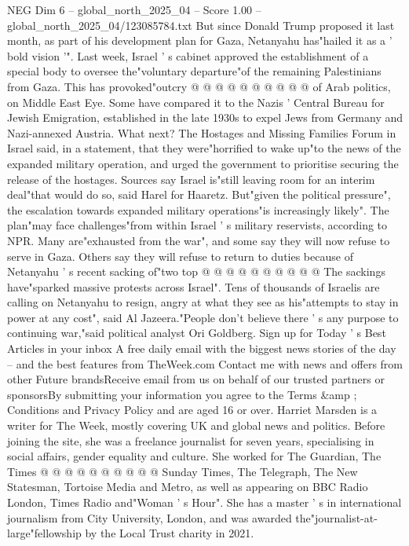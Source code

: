 \begin{textsample}{NEG Dim 6 – global\_north\_2025\_04 – Score 1.00 – global\_north\_2025\_04/123085784.txt}
But since Donald Trump proposed it last month, as part of his development plan for Gaza, Netanyahu has"hailed it as a ' bold vision '".
Last week, Israel ' s cabinet approved the establishment of a special body to oversee the"voluntary departure"of the remaining Palestinians from Gaza.
This has provoked"outcry @ @ @ @ @ @ @ @ @ @ of Arab politics, on Middle East Eye.
Some have compared it to the Nazis ' Central Bureau for Jewish Emigration, established in the late 1930s to expel Jews from Germany and Nazi-annexed Austria.
What next?
The Hostages and Missing Families Forum in Israel said, in a statement, that they were"horrified to wake up"to the news of the expanded military operation, and urged the government to prioritise securing the release of the hostages.
Sources say Israel is"still leaving room for an interim deal"that would do so, said Harel for Haaretz.
But"given the political pressure", the escalation towards expanded military operations"is increasingly likely".
The plan"may face challenges"from within Israel ' s military reservists, according to NPR.
Many are"exhausted from the war", and some say they will now refuse to serve in Gaza.
Others say they will refuse to return to duties because of Netanyahu ' s recent sacking of"two top @ @ @ @ @ @ @ @ @ @ The sackings have"sparked massive protests across Israel".
Tens of thousands of Israelis are calling on Netanyahu to resign, angry at what they see as his"attempts to stay in power at any cost", said Al Jazeera."People don't believe there ' s any purpose to continuing war,"said political analyst Ori Goldberg.
Sign up for Today ' s Best Articles in your inbox A free daily email with the biggest news stories of the day -- and the best features from TheWeek.com Contact me with news and offers from other Future brandsReceive email from us on behalf of our trusted partners or sponsorsBy submitting your information you agree to the Terms \&amp ; Conditions and Privacy Policy and are aged 16 or over.
Harriet Marsden is a writer for The Week, mostly covering UK and global news and politics.
Before joining the site, she was a freelance journalist for seven years, specialising in social affairs, gender equality and culture.
She worked for The Guardian, The Times @ @ @ @ @ @ @ @ @ @ Sunday Times, The Telegraph, The New Statesman, Tortoise Media and Metro, as well as appearing on BBC Radio London, Times Radio and"Woman ' s Hour".
She has a master ' s in international journalism from City University, London, and was awarded the"journalist-at-large"fellowship by the Local Trust charity in 2021.

\end{textsample}
